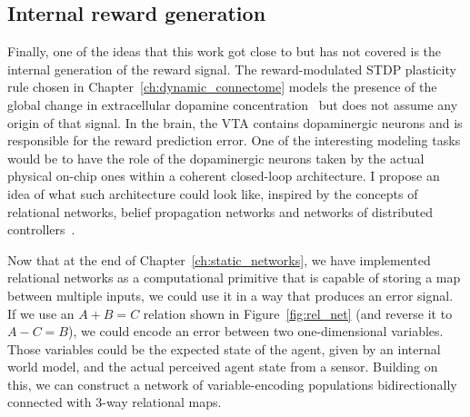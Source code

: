 
\subsection{Internal reward generation}

Finally, one of the ideas that this work got close to but has not covered is the internal generation of the reward signal. The reward-modulated STDP plasticity rule chosen in Chapter~\ref{ch:dynamic_connectome} models the presence of the global change in extracellular dopamine concentration~\cite{Izhikevich07} but does not assume any origin of that signal. In the brain, the \ac{VTA} contains dopaminergic neurons and is responsible for the reward prediction error\cite{WatabeUchida_etal17}. One of the interesting modeling tasks would be to have the role of the dopaminergic neurons taken by the actual physical on-chip ones within a coherent closed-loop architecture. I propose an idea of what such architecture could look like, inspired by the concepts of relational networks, belief propagation networks and networks of distributed controllers~\cite{Diehl_Cook16, Jug12}.

Now that at the end of Chapter~\ref{ch:static_networks}, we have implemented relational networks as a computational primitive that is capable of storing a map between multiple inputs, we could use it in a way that produces an error signal. If we use an $A+B=C$ relation shown in Figure~\ref{fig:rel_net} (and reverse it to $A-C=B$), we could encode an error between two one-dimensional variables. Those variables could be the expected state of the agent, given by an internal world model, and the actual perceived agent state from a sensor. Building on this, we can construct a network of variable-encoding populations bidirectionally connected with 3-way relational maps.

